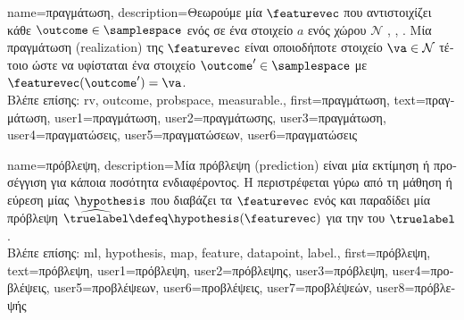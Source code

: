{name={\foreignlanguage{greek}{πραγμάτωση}},
	description={\foreignlanguage{greek}{Θεωρούμε μία}  $\featurevec$ 
		\foreignlanguage{greek}{που αντιστοιχίζει κάθε}  $\outcome \in \samplespace$ \foreignlanguage{greek}{ενός} 
		 \foreignlanguage{greek}{σε ένα στοιχείο $a$ ενός}  \foreignlanguage{greek}{χώρου} 
		$\mathcal{N}$ \cite{RudinBookPrinciplesMatheAnalysis}, \cite{BillingsleyProbMeasure}, \cite{HalmosMeasure}. 
		\foreignlanguage{greek}{Μία πραγμάτωση} (realization) \foreignlanguage{greek}{της $\featurevec$ είναι οποιοδήποτε στοιχείο 
		$\va \in \mathcal{N}$ τέτοιο ώστε να υφίσταται ένα στοιχείο $\outcome' \in \samplespace$ με} $\featurevec(\outcome') = \va$.
		\\
		\foreignlanguage{greek}{Βλέπε επίσης:} \gls{rv}, \gls{outcome}, \gls{probspace}, \gls{measurable}.}, 
	first={\foreignlanguage{greek}{πραγμάτωση}},
	text={\foreignlanguage{greek}{πραγμάτωση}},
	user1={\foreignlanguage{greek}{πραγμάτωση}}, %
  	user2={\foreignlanguage{greek}{πραγμάτωσης}}, %
	user3={\foreignlanguage{greek}{πραγμάτωση}}, %
  	user4={\foreignlanguage{greek}{πραγματώσεις}}, %
	user5={\foreignlanguage{greek}{πραγματώσεων}}, %
  	user6={\foreignlanguage{greek}{πραγματώσεις}} %
}

{name={\foreignlanguage{greek}{πρόβλεψη}},
	description={\foreignlanguage{greek}{Μία πρόβλεψη} (prediction)
		\foreignlanguage{greek}{είναι μία εκτίμηση ή προσέγγιση για κάποια ποσότητα ενδιαφέροντος. Η} 
		 \foreignlanguage{greek}{περιστρέφεται γύρω από τη μάθηση ή εύρεση μίας}  
		 $\hypothesis$ \foreignlanguage{greek}{που διαβάζει τα}  $\featurevec$ 
		\foreignlanguage{greek}{ενός}  \foreignlanguage{greek}{και παραδίδει μία πρόβλεψη 
		$\widehat{\truelabel} \defeq \hypothesis(\featurevec)$ για την}  \foreignlanguage{greek}{του} $\truelabel$.
		\\
		\foreignlanguage{greek}{Βλέπε επίσης:} \gls{ml}, \gls{hypothesis}, \gls{map}, \gls{feature}, \gls{datapoint}, \gls{label}.},
	first={\foreignlanguage{greek}{πρόβλεψη}},
	text={\foreignlanguage{greek}{πρό\-βλε\-ψη}},
	user1={\foreignlanguage{greek}{πρόβλεψη}}, %
  	user2={\foreignlanguage{greek}{πρόβλεψης}}, %
	user3={\foreignlanguage{greek}{πρόβλεψη}}, %
	user4={\foreignlanguage{greek}{προβλέψεις}}, %
	user5={\foreignlanguage{greek}{προβλέψεων}}, %
	user6={\foreignlanguage{greek}{προβλέψεις}}, %
	user7={\foreignlanguage{greek}{προβλέψεών}}, %
	user8={\foreignlanguage{greek}{πρόβλεψής}} %
}

